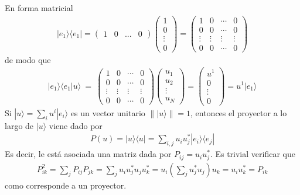 \documentclass[letterpaper,10pt,english]{jupyterBook}
\newcommand{\bra}[1]{\langle #1|}
\newcommand{\ket}[1]{|#1\rangle}
\newcommand{\braket}[2]{\langle #1|#2\rangle}
\newcommand{\ketbra}[2]{| #1\rangle \langle #2 |}
\begin{document}
\sphinxAtStartPar
En forma matricial
\begin{equation*}
\begin{split}
 \ket{e_1}\bra{e_1} = \begin{pmatrix} 1 & 0 & ...& 0 \end{pmatrix} \begin{pmatrix} 1 \\ 0 \\ \vdots\\ 0 \end{pmatrix} =
 \begin{pmatrix} 1 & 0 &  \cdots & 0 \\ 0 & 0  & \cdots & 0 \\ 
 \vdots & \vdots &\vdots & \vdots  \\
 0  & 0 & \cdots & 0\end{pmatrix}
 \end{split}
\end{equation*}
\sphinxAtStartPar
de modo que
\begin{equation*}
\begin{split}
    \ket{e_1}\braket{e_1}{u} ~= ~\begin{pmatrix} 1 & 0 &  \cdots & 0 \\ 0 & 0  & \cdots & 0 \\ 
 \vdots & \vdots &\vdots & \vdots  \\
 0  & 0 & \cdots & 0\end{pmatrix} \begin{pmatrix} u_1 \\ u_2 \\ \vdots \\ u_N \end{pmatrix}
 = \begin{pmatrix} u^1 \\ 0 \\ \vdots \\ 0 \end{pmatrix} = u^1 \ket{e_1}
\end{split}
\end{equation*}
\sphinxAtStartPar
Si \(\ket{u} = \sum_i u^i\ket{e_i}\) es un vector unitario  \(\|\ket{u}\|=1\), entonces el proyector a lo largo de \(\ket{u}\) viene dado por
\begin{equation*}
\begin{split}
P(u) = \ketbra{u}{u} = \sum_{i,j} u_i u^*_j \ketbra{e_i}{e_j}
\end{split}
\end{equation*}
\sphinxAtStartPar
Es decir, le está asociada una matriz dada por \(P_{ij}=u_iu^*_j\). Es trivial verificar que
\begin{equation*}
\begin{split}
P^2_{ik} = \sum_j P_{ij}P_{jk} = \sum_j u_i u^*_j u_j u^*_k = u_i\left(\sum_j u^*_j u_j\right) u_k = u_i u_k^* = P_{ik}
\end{split}
\end{equation*}
\sphinxAtStartPar
como corresponde a un proyector.
\end{document}
